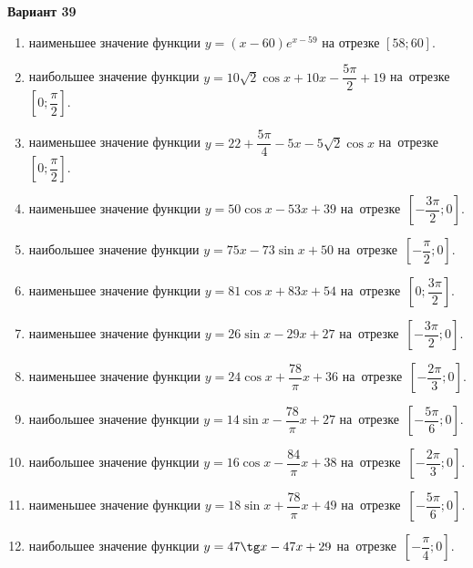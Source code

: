 \documentclass[a4paper,10pt]{article}
\begin{document}
\begin{center}\Large\textbf{Вариант 39}\end{center}

\begin{enumerate}
\item {} наименьшее значение функции $y = \left(x-60\right)e^{x-59}$ на отрезке $\left[58;60\right]$.

\item {} наибольшее значение функции $y = 10\sqrt{2}\cos x+10x-\dfrac{5\pi}{2} +19$ на~отрезке~$\left[0;\dfrac{\pi }{2}\right]$.

\item {} наименьшее значение функции $y = 22+\dfrac{5 \pi}{4}-5x-5\sqrt{2}\cos x$ на~отрезке~$\left[0;\dfrac{\pi }{2}\right]$.

\item {} наименьшее значение функции $y = 50\cos x-53x+39$ на~отрезке~$\left[-\dfrac{3\pi }{2};0\right]$.

\item {} наибольшее значение функции $y = 75x-73\sin x+50$ на~отрезке~$\left[-\dfrac{\pi }{2};0\right]$.

\item {} наименьшее значение функции $y = 81\cos x+83x+54$ на~отрезке~$\left[0;\dfrac{3\pi }{2}\right]$.

\item {} наименьшее значение функции $y = 26\sin x-29x+27$ на~отрезке~$\left[-\dfrac{3\pi }{2};0\right]$.

\item {} наименьшее значение функции $y = 24\cos x+\dfrac{78}{\pi }x +36$ на~отрезке~$\left[-\dfrac{2\pi }{3};0\right]$.

\item {} наибольшее значение функции $y = 14\sin x-\dfrac{78}{\pi }x+27$ на~отрезке~$\left[-\dfrac{5\pi }{6};0\right]$.

\item {} наибольшее значение функции $y = 16\cos x-\dfrac{84}{\pi }x+38$ на~отрезке~$\left[-\dfrac{2\pi }{3};0\right]$.

\item {} наименьшее значение функции $y = 18\sin x+\dfrac{78}{\pi }x+49$ на~отрезке~$\left[-\dfrac{5\pi }{6};0\right]$.

\item {} наибольшее значение функции $y = 47\tg x-47x+29$ на~отрезке~$\left[-\dfrac{\pi }{4};0\right]$.


\end{enumerate}
\end{document}

